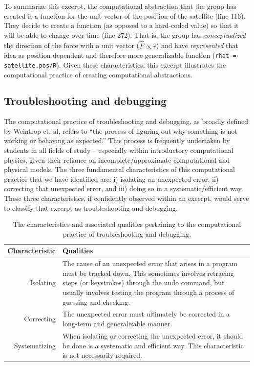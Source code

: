 \documentclass{msuphddissertation}
\begin{document}
\begin{doublespace}
To summarize this excerpt, the computational abstraction that the group has created is a function for the unit vector of the position of the satellite (line 116).  They decide to create a function (as opposed to a hard-coded value) so that it will be able to change over time (line 272).  That is, the group has \textit{conceptualized} the direction of the force with a unit vector ($\vec{F}\propto\hat{r}$) and have \textit{represented} that idea as position dependent and therefore more generalizable function (\texttt{rhat = satellite.pos/R}).  Given these characteristics, this excerpt illustrates the computational practice of creating computational abstractions.

\subsection{Troubleshooting and debugging}

The computational practice of troubleshooting and debugging, as broadly defined by Weintrop et. al, refers to ``the process of figuring out why something is not working or behaving as expected.''  This process is frequently undertaken by students in all fields of study -- especially within introductory computational physics, given their reliance on incomplete/approximate computational and physical models.  The three fundamental characteristics of this computational practice that we have identified are: i) isolating an unexpected error, ii) correcting that unexpected error, and iii) doing so in a systematic/efficient way.  These three characteristics, if confidently observed within an excerpt, would serve to classify that excerpt as troubleshooting and debugging.

\begin{table}
\begin{tabular}{r|p{}}
Characteristic & Qualities \\\hline\hline
Isolating & The cause of an unexpected error that arises in a program must be tracked down.  This sometimes involves retracing steps (or keystrokes) through the undo command, but usually involves testing the program through a process of guessing and checking.\\
Correcting & The unexpected error must ultimately be corrected in a long-term and generalizable manner.\\
Systematizing & When isolating or correcting the unexpected error, it should be done is a systematic and efficient way.  This characteristic is not necessarily required.\\
\end{tabular}\caption{The characteristics and associated qualities pertaining to the computational practice of troubleshooting and debugging.}
\end{table}


\end{doublespace}
\end{document}

